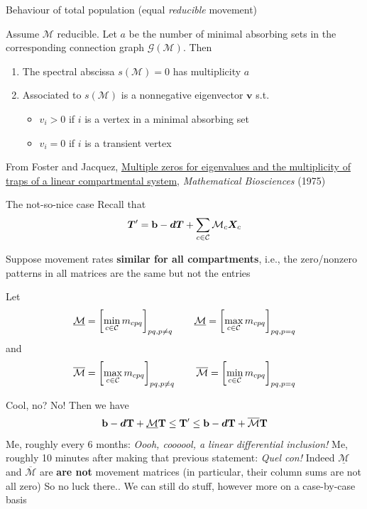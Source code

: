 \documentclass[aspectratio=169]{beamer}\usepackage[]{graphicx}\usepackage[]{xcolor}
\begin{document}
\begin{frame}{Behaviour of total population (equal \emph{reducible} movement)}
\begin{theorem}
Assume $\mathcal{M}$ reducible. Let $a$ be the number of minimal absorbing sets in the corresponding connection graph $\mathcal{G}(\mathcal{M})$. Then
\begin{enumerate}
	\item The spectral abscissa $s(\mathcal{M})=0$ has multiplicity $a$
	\item Associated to $s(\mathcal{M})$ is a nonnegative eigenvector $\mathbf{v}$ s.t.
	\begin{itemize}
		\item $v_i>0$ if $i$ is a vertex in a minimal absorbing set
		\item $v_i=0$ if $i$ is a transient vertex
	\end{itemize}
\end{enumerate}
\end{theorem}

\vfill
From Foster and Jacquez, \href{https://doi.org/10.1016/0025-5564(75)90096-6}{Multiple zeros for eigenvalues and the multiplicity of traps of a linear compartmental system}, \emph{Mathematical Biosciences} (1975)
\end{frame}


\begin{frame}{The not-so-nice case}
Recall that
$$
\bm{T}'=\mathbf{b}-\bm{d}\bm{T}+\sum_{c\in\mathcal{C}}\mathcal{M}_c\bm{X}_{c}
$$

Suppose movement rates \textbf{similar for all compartments}, i.e., the zero/nonzero patterns in all matrices are the same but not the entries

Let
$$
\underline{\mathcal{M}}=\left[\min_{c\in\mathcal{C}}m_{cpq}\right]_{pq,p\neq q}\qquad 
\underline{\mathcal{M}}=\left[\max_{c\in\mathcal{C}}m_{cpq}\right]_{pq,p=q}
$$
and
$$
\overline{\mathcal{M}}=\left[\max_{c\in\mathcal{C}}m_{cpq}\right]_{pq,p\neq q}\qquad
\overline{\mathcal{M}}=\left[\min_{c\in\mathcal{C}}m_{cpq}\right]_{pq,p=q}
$$
\end{frame}


\begin{frame}{Cool, no? No!}
Then we have
$$
\mathbf{b}-\bm{d}\mathbf{T}+\underline{\mathcal{M}}\mathbf{T}\leq\mathbf{T}'\leq\mathbf{b}-\bm{d}\mathbf{T}+\overline{\mathcal{M}}\mathbf{T}
$$
\vfill
Me, roughly every 6 months: \emph{Oooh, coooool, a linear differential inclusion!}
\vfill
Me, roughly 10 minutes after making that previous statement: \emph{Quel con!} 
\vfill
Indeed $\underline{\mathcal{M}}$ and $\overline{\mathcal{M}}$ are \textbf{are not} movement matrices  (in particular, their column sums are not all zero)
\vfill
So no luck there.. 
\vfill
We can still do stuff, however more on a case-by-case basis
\end{frame}
\end{document}
